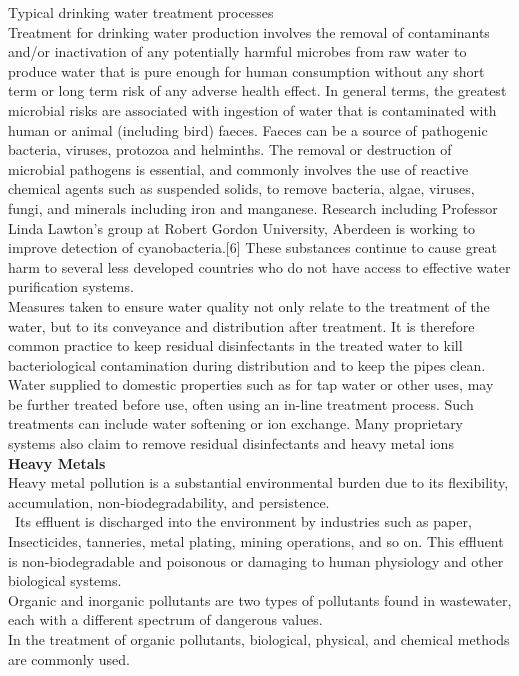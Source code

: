 \documentclass{article}
\begin{document}
Typical drinking water treatment processes\\
Treatment for drinking water production involves the removal of contaminants and/or inactivation of any potentially harmful microbes from raw water to produce water that is pure enough for human consumption without any short term or long term risk of any adverse health effect. In general terms, the greatest microbial risks are associated with ingestion of water that is contaminated with human or animal (including bird) faeces. Faeces can be a source of pathogenic bacteria, viruses, protozoa and helminths. The removal or destruction of microbial pathogens is essential, and commonly involves the use of reactive chemical agents such as suspended solids, to remove bacteria, algae, viruses, fungi, and minerals including iron and manganese. Research including Professor Linda Lawton's group at Robert Gordon University, Aberdeen is working to improve detection of cyanobacteria.[6] These substances continue to cause great harm to several less developed countries who do not have access to effective water purification systems.\\
Measures taken to ensure water quality not only relate to the treatment of the water, but to its conveyance and distribution after treatment. It is therefore common practice to keep residual disinfectants in the treated water to kill bacteriological contamination during distribution and to keep the pipes clean.\\
Water supplied to domestic properties such as for tap water or other uses, may be further treated before use, often using an in-line treatment process. Such treatments can include water softening or ion exchange. Many proprietary systems also claim to remove residual disinfectants and heavy metal ions\\
\textbf{Heavy Metals}\\
Heavy metal pollution is a substantial environmental burden due to its flexibility, accumulation, non-biodegradability, and persistence. \\\
Its effluent is discharged into the environment by industries such as paper, Insecticides, tanneries, metal plating, mining operations, and so on. This effluent is non-biodegradable and poisonous or damaging to human physiology and other biological systems.\\
Organic and inorganic pollutants are two types of pollutants found in wastewater, each with a different spectrum of dangerous values.\\
In the treatment of organic pollutants, biological, physical, and chemical methods are commonly used. \\
\end{document}
